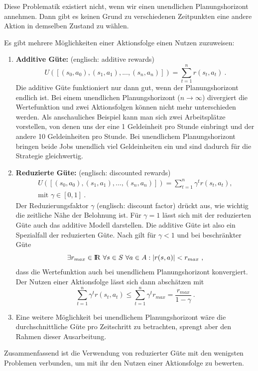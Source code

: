 \documentclass[a4paper]{IEEEtran}
\def\IR{\mathrm{I\hspace{-2pt}R}} %
\begin{document}
Diese Problematik existiert nicht, wenn wir einen unendlichen Planungshorizont annehmen. Dann gibt es keinen Grund zu verschiedenen Zeitpunkten eine andere Aktion in demselben Zustand zu wählen.

Es gibt mehrere Möglichkeiten einer Aktionsfolge einen Nutzen zuzuweisen:
\begin{enumerate}
	\item \textbf{Additive Güte:} (englisch: additive rewards)
		\begin{equation}
			U([ (s_0, a_0), (s_1, a_1), ..., (s_n, a_n)]) = \sum\limits_{t=1}^n r(s_t, a_t)\ .
		\end{equation}
		Die additive Güte funktioniert nur dann gut, wenn der Planungshorizont endlich ist. Bei einem unendlichen Planungshorizont ($n \rightarrow \infty$) divergiert die Wertefunktion und zwei Aktionsfolgen können nicht mehr unterschieden werden. Als anschauliches Beispiel kann man sich zwei Arbeitsplätze vorstellen, von denen uns der eine 1 Geldeinheit pro Stunde einbringt und der andere 10 Geldeinheiten pro Stunde. Bei unendlichem Planungshorizont bringen beide Jobs unendlich viel Geldeinheiten ein und sind dadurch für die Strategie gleichwertig.
	\item \textbf{Reduzierte Güte:} (englisch: discounted rewards)
		\begin{equation}
			\begin{split}
				U([ (s_0, a_0), (s_1, a_1), ..., (s_n, a_n)]) = \sum\limits_{t=1}^n \gamma^t r(s_t, a_t),\\
				\text{mit }\gamma \in [0,1]\ .
			\end{split}
		\end{equation}
		Der Reduzierungsfaktor $\gamma$ (englisch: discount factor) drückt aus, wie wichtig die zeitliche Nähe der Belohnung ist. Für $\gamma=1$ lässt sich mit der reduzierten Güte auch das additive Modell darstellen. Die additive Güte ist also ein Spezialfall der reduzierten Güte. Nach \cite{thrun2005probabilistic} gilt für $\gamma < 1$ und bei beschränkter Güte 
		\begin{equation}
			\exists r_{max} \in \IR\ \forall s \in S\ \forall a \in A: |r(s,a)| < r_{max} \ ,
		\end{equation}
		dass die Wertefunktion auch bei unendlichem Planungshorizont konvergiert. Der Nutzen einer Aktionsfolge lässt sich dann abschätzen mit  
		\begin{equation}
			\sum\limits_{t=1}^n \gamma^t r(s_t, a_t) \leq \sum\limits_{t=1}^n \gamma^t r_{max} = \frac{r_{max}}{1-\gamma}  \ .
		\end{equation}
	\item
		Eine weitere Möglichkeit bei unendlichem Planungshorizont wäre die durchschnittliche Güte pro Zeitschritt zu betrachten, sprengt aber den Rahmen dieser Ausarbeitung.
\end{enumerate}
Zusammenfassend ist die Verwendung von reduzierter Güte mit den wenigsten Problemen verbunden, um mit ihr den Nutzen einer Aktionsfolge zu bewerten.
\end{document}

